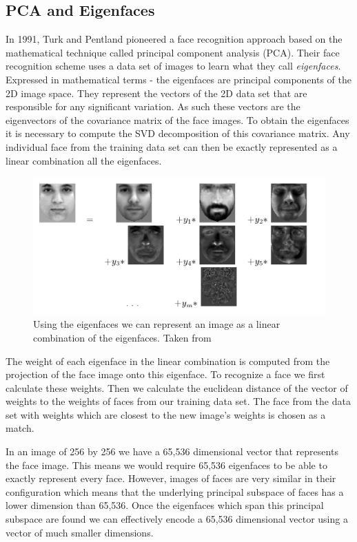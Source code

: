 \documentclass[11pt,a4paper]{book}
\begin{document}
   

\subsection{PCA and Eigenfaces}
In 1991, Turk and Pentland \cite{eigenfaces91} pioneered a face recognition approach
based on the mathematical
technique called principal component analysis (PCA). Their face recognition
scheme uses a data set of images to learn what they call
\textit{eigenfaces}. Expressed in mathematical terms - the eigenfaces are principal components of the 2D image
space. They represent the vectors of the 2D data set that are responsible for any
significant variation. 
As such these vectors are the eigenvectors of the covariance matrix of the face
images. To obtain the eigenfaces it is necessary to compute the SVD decomposition of this
covariance matrix. Any individual face from the training data set can then be
exactly represented as a linear combination all the eigenfaces.

\begin{figure}[H]
\centering
\includegraphics[scale=0.5]{images/eigenfaces_comb_from_nn_vienna.png}
\caption{ Using the eigenfaces we can represent an image as a linear combination of the
  eigenfaces. Taken from \cite{vienna} }
\label{gr:eigenfaces}
\end{figure}

The weight of each eigenface in the linear combination is computed from the
projection of the face image onto this eigenface. To recognize a face we
 first calculate these weights. Then we calculate the euclidean distance of the vector
of weights to the weights of faces from our training data set. The face from
the data set with weights which are closest to the new image's weights is chosen
as a match.

In an image of 256 by 256 we have a 65,536 dimensional vector that
represents the face image. This means we would require 65,536 eigenfaces to be
able to exactly represent every face. However, images of faces are very similar
in their configuration which means that the underlying principal subspace of
faces has a lower dimension than 65,536. Once the eigenfaces which span this
principal subspace are found we can
effectively encode a 65,536 dimensional vector using a vector of much smaller
dimensions. 
\end{document}
